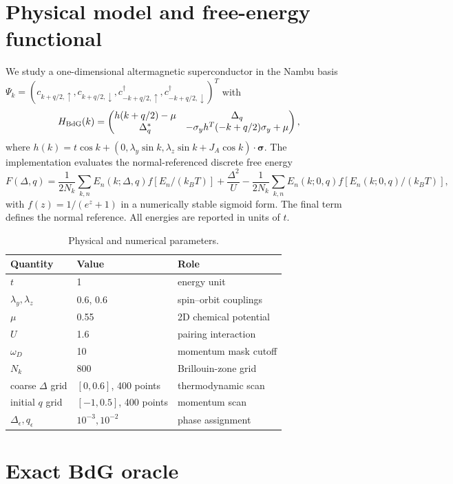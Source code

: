 \section{Physical model and free-energy functional}
We study a one-dimensional altermagnetic superconductor in the Nambu basis
$\Psi_k=(c_{k+q/2,\uparrow},c_{k+q/2,\downarrow},c^\dagger_{-k+q/2,\uparrow},c^\dagger_{-k+q/2,\downarrow})^T$ with
\begin{equation}
H_{\rm BdG}(k)=\begin{pmatrix}h(k+q/2)-\mu&\Delta_q\\ \Delta_q^*&-\sigma_y h^T(-k+q/2)\sigma_y+\mu\end{pmatrix},
\end{equation}
where $h(k)=t\cos k+(0,\lambda_y\sin k,\lambda_z\sin k+J_A\cos k)\cdot\boldsymbol\sigma$.
The implementation evaluates the normal-referenced discrete free energy
\begin{equation}
F(\Delta,q)=\frac{1}{2N_k}\sum_{k,n}E_n(k;\Delta,q)f[E_n/(k_BT)]+\frac{\Delta^2}{U}-\frac{1}{2N_k}\sum_{k,n}E_n(k;0,q)f[E_n(k;0,q)/(k_BT)],
\end{equation}
with $f(z)=1/(e^z+1)$ in a numerically stable sigmoid form.  The final term defines the normal reference.  All energies are reported in units of $t$.

\begin{table}[h]\caption{Physical and numerical parameters.}\label{tab:s1}\centering\small
\begin{tabular}{lll}\toprule Quantity & Value & Role\\\midrule
$t$ & 1 & energy unit\\ $\lambda_y,\lambda_z$ & 0.6, 0.6 & spin--orbit couplings\\ $\mu$ & 0.55 & 2D chemical potential\\ $U$ & 1.6 & pairing interaction\\ $\omega_D$ & 10 & momentum mask cutoff\\ $N_k$ & 800 & Brillouin-zone grid\\ coarse $\Delta$ grid & $[0,0.6]$, 400 points & thermodynamic scan\\ initial $q$ grid & $[-1,0.5]$, 400 points & momentum scan\\ $\Delta_\epsilon,q_\epsilon$ & $10^{-3},10^{-2}$ & phase assignment\\\bottomrule\end{tabular}\end{table}

\section{Exact BdG oracle}
